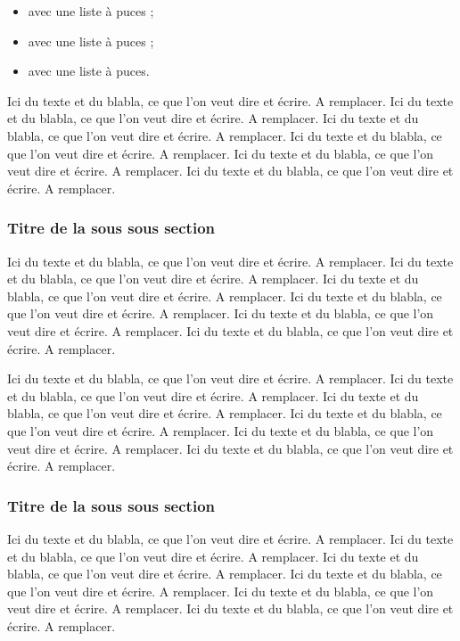 \begin{itemize}
\item avec une liste à puces ;
\item avec une liste à puces ;
\item avec une liste à puces.
\end{itemize}

Ici du texte et du blabla, ce que l'on veut dire et écrire. A remplacer. Ici du texte et du blabla, ce que l'on veut dire et écrire. A remplacer. Ici du texte et du blabla, ce que l'on veut dire et écrire. A remplacer. Ici du texte et du blabla, ce que l'on veut dire et écrire. A remplacer. Ici du texte et du blabla, ce que l'on veut dire et écrire. A remplacer. Ici du texte et du blabla, ce que l'on veut dire et écrire. A remplacer.

\subsubsection{Titre de la sous sous section}

Ici du texte et du blabla, ce que l'on veut dire et écrire. A remplacer. Ici du texte et du blabla, ce que l'on veut dire et écrire. A remplacer. Ici du texte et du blabla, ce que l'on veut dire et écrire. A remplacer. Ici du texte et du blabla, ce que l'on veut dire et écrire. A remplacer. Ici du texte et du blabla, ce que l'on veut dire et écrire. A remplacer. Ici du texte et du blabla, ce que l'on veut dire et écrire. A remplacer.

Ici du texte et du blabla, ce que l'on veut dire et écrire. A remplacer. Ici du texte et du blabla, ce que l'on veut dire et écrire. A remplacer. Ici du texte et du blabla, ce que l'on veut dire et écrire. A remplacer. Ici du texte et du blabla, ce que l'on veut dire et écrire. A remplacer. Ici du texte et du blabla, ce que l'on veut dire et écrire. A remplacer. Ici du texte et du blabla, ce que l'on veut dire et écrire. A remplacer.

\subsubsection{Titre de la sous sous section}

Ici du texte et du blabla, ce que l'on veut dire et écrire. A remplacer. Ici du texte et du blabla, ce que l'on veut dire et écrire. A remplacer. Ici du texte et du blabla, ce que l'on veut dire et écrire. A remplacer. Ici du texte et du blabla, ce que l'on veut dire et écrire. A remplacer. Ici du texte et du blabla, ce que l'on veut dire et écrire. A remplacer. Ici du texte et du blabla, ce que l'on veut dire et écrire. A remplacer.

